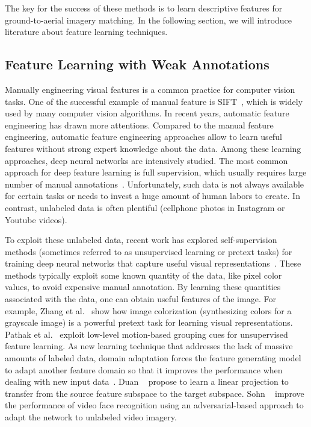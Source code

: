 The key for the success of these methods is to learn descriptive
features for ground-to-aerial imagery matching. In the following
section, we will introduce literature about feature learning techniques.

\subsection{Feature Learning with Weak Annotations}

Manually engineering visual features is a common practice for
computer vision tasks. One of the successful example of manual
feature is SIFT~\cite{lowe1999object}, which is widely used by many
computer vision algorithms.
In recent years, automatic feature engineering has drawn more
attentions. Compared to the manual feature
engineering, automatic feature engineering approaches allow to learn
useful features without strong expert knowledge about the data. Among
these learning approaches, deep neural networks are intensively studied.
The most common approach for deep feature learning is full
supervision, which usually requires large number of manual
annotations~\cite{yosinski2014transferable,zhou2016learning,wen2016discriminative}.
Unfortunately, such data is not always available for certain tasks or
needs to invest a huge amount of human labors to create.  In contrast,
unlabeled data is often plentiful (\ie cellphone photos in Instagram
or Youtube videos).

To exploit these unlabeled data, recent work has explored
self-supervision methods (sometimes referred to as unsupervised learning or
pretext tasks) for training deep neural networks that capture useful
visual representations~\cite{doersch2015unsupervised,pathak2016context}. 
These methods typically
exploit some known quantity of the data, like pixel color values, to
avoid expensive manual annotation.
By learning these quantities associated with the data, one
can obtain useful features of the image.
For example, Zhang et al.~\cite{zhang2016colorful} show how image
colorization (synthesizing colors for a grayscale image) is a powerful
pretext task for learning visual representations. Pathak et
al.~\cite{pathak2017learning} exploit low-level motion-based grouping
cues for unsupervised feature learning.  
%
As new learning technique that addresses the lack of massive amounts
of labeled data, domain adaptation forces the feature generating model
to adapt another feature domain so that it improves the performance
when dealing with new input
data~\cite{fernando2013unsupervised,fernando2015joint,saenko2010adapting,wang2016actions,tinghui2016flow}.
Duan \etal~\cite{duan2012learning} propose to learn a linear
projection to transfer from the source feature subspace to the target
subspace. Sohn \etal~\cite{sohn2017unsupervised} improve the
performance of video face recognition using an adversarial-based
approach to adapt the network to unlabeled video imagery.

